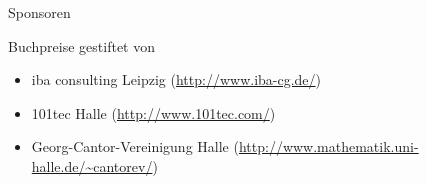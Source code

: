 \begin{slide}{Sponsoren}

Buchpreise gestiftet von
\begin{itemize}
\item
iba consulting Leipzig (\url{http://www.iba-cg.de/})
\item
101tec Halle (\url{http://www.101tec.com/})
\item
Georg-Cantor-Vereinigung Halle
(\url{http://www.mathematik.uni-halle.de/~cantorev/})
\end{itemize}
\end{slide}
